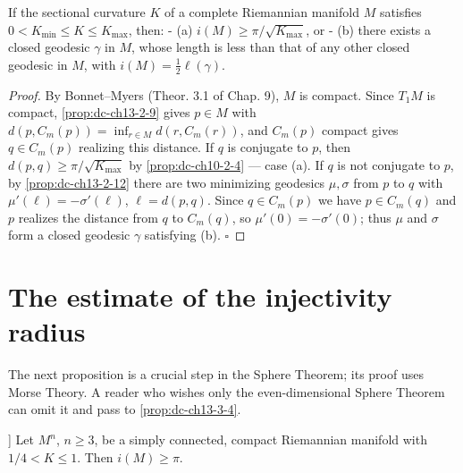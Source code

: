 \begin{proposition}
  \label{prop:dc-ch13-2-13}
  If the sectional curvature $K$ of a complete Riemannian manifold $M$ satisfies
  $0<K_{\min}\leq K\leq K_{\max}$, then:
  - (a) $i(M)\geq\pi/\sqrt{K_{\max}}$, or
  - (b) there exists a closed geodesic $\gamma$ in $M$, whose length is less than that
    of any other closed geodesic in $M$, with $i(M)=\tfrac{1}{2}\ell(\gamma)$.
\end{proposition}
\begin{proof}
  By Bonnet–Myers (Theor. 3.1 of Chap. 9), $M$ is compact. Since $T_1M$ is
  compact, \cref{prop:dc-ch13-2-9} gives $p\in M$ with $d(p,C_m(p))=\inf_{r\in M}d(r,C_m(r))$,
  and $C_m(p)$ compact gives $q\in C_m(p)$ realizing this distance. If $q$ is conjugate
  to $p$, then $d(p,q)\geq\pi/\sqrt{K_{\max}}$ by \cref{prop:dc-ch10-2-4} — case
  (a). If $q$ is not conjugate to $p$, by \cref{prop:dc-ch13-2-12} there are two minimizing
  geodesics $\mu,\sigma$ from $p$ to $q$ with $\mu'(\ell)=-\sigma'(\ell)$,
  $\ell=d(p,q)$. Since $q\in C_m(p)$ we have $p\in C_m(q)$ and $p$ realizes the
  distance from $q$ to $C_m(q)$, so $\mu'(0)=-\sigma'(0)$; thus $\mu$ and $\sigma$ form
  a closed geodesic $\gamma$ satisfying (b). $\square$
\end{proof}

\section{The estimate of the injectivity radius}

The next proposition is a crucial step in the Sphere Theorem; its proof uses Morse
Theory. A reader who wishes only the even-dimensional Sphere Theorem can omit it and
pass to \cref{prop:dc-ch13-3-4}.

\begin{proposition}[Klingenberg [Kℓ 2]]
  \label{prop:dc-ch13-3-1}
  Let $M^n$, $n\geq 3$, be a simply connected, compact Riemannian manifold with
  $1/4<K\leq 1$. Then $i(M)\geq\pi$.
\end{proposition}

